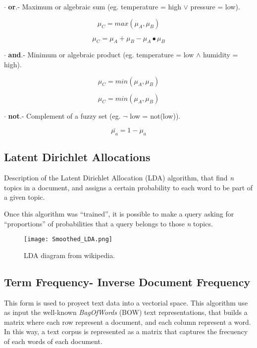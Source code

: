 $\cdot$ \textbf{or}.- Maximum or algebraic sum (eg. temperature = high $\vee$ pressure = low).
\begin{center}
\begin{equation}
\label{fuzzySet11}
	\mu_C = max(\mu_A,\mu_B) 
\end{equation}

\begin{equation}
\label{fuzzySet12}
	\mu_C = \mu_A + \mu_B - \mu_A\bullet\mu_B
\end{equation}
\end{center}


$\cdot$ \textbf{and}.- Minimum or algebraic product (eg. temperature = low $\wedge$ humidity = high).
\begin{center}
\begin{equation}
\label{fuzzySet21}
	\mu_C = min(\mu_A, \mu_B) 
\end{equation}

\begin{equation}
\label{fuzzySet22}
	\mu_C = min(\mu_A, \mu_B) 
\end{equation}
\end{center}

$\cdot$ \textbf{not}.- Complement of a fuzzy set (eg. $\neg$ low = not(low)).
\begin{center}
\begin{equation}
\label{fuzzySet3}
	\bar{\mu_a} = 1 - \mu_a
\end{equation}
\end{center}
%

\subsection{Latent Dirichlet Allocations}
Description of the Latent Dirichlet Allocation (LDA) algorithm, 
that find \textit{n} topics in a document, and assigns a certain probability to each word to be part of a given topic. 

Once this algorithm was ``trained'', it is possible to make a query asking for ``proportions'' of probabilities that a query belongs to those \textit{n} topics.

\begin{figure}[h]
	\label{fig:lda_esquema}
	\texttt{[image: Smoothed\_LDA.png]}
    \caption{LDA diagram from wikipedia.}
\end{figure}

\subsection{Term Frequency- Inverse Document Frequency}
This form is used to proyect text data into a vectorial space. This algorithm use as input the well-known \textit{BagOfWords} (BOW) text representations, that builds a matrix where each row represent a document, and each column represent a word. In this way, a text corpus is represented as a matrix that captures the frecuency of each words of each document. 

